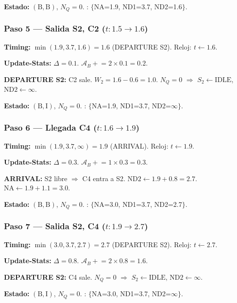 \documentclass[11pt, letterpaper]{article}
\begin{document}
\textbf{Estado:} $(\text{B}, \text{B})$, $N_Q = 0$. \quad \FEL: $\{$NA=1.9, ND1=3.7, ND2=1.6$\}$.

\subsubsection*{Paso 5 --- Salida S2, C2 ($t: 1.5 \to 1.6$)}

\textbf{Timing:} $\min(1.9, 3.7, 1.6) = 1.6$ (DEPARTURE S2). Reloj: $t \leftarrow 1.6$.

\textbf{Update-Stats:} $\Delta = 0.1$. $\mathcal{A}_B \mathrel{+}= 2 \times 0.1 = 0.2$.

\textbf{DEPARTURE S2:} C2 sale. $W_2 = 1.6 - 0.6 = 1.0$. $N_Q = 0$ $\Rightarrow$ $S_2 \leftarrow \text{IDLE}$, $\text{ND2} \leftarrow \infty$.

\textbf{Estado:} $(\text{B}, \text{I})$, $N_Q = 0$. \quad \FEL: $\{$NA=1.9, ND1=3.7, ND2=$\infty\}$.

\subsubsection*{Paso 6 --- Llegada C4 ($t: 1.6 \to 1.9$)}

\textbf{Timing:} $\min(1.9, 3.7, \infty) = 1.9$ (ARRIVAL). Reloj: $t \leftarrow 1.9$.

\textbf{Update-Stats:} $\Delta = 0.3$. $\mathcal{A}_B \mathrel{+}= 1 \times 0.3 = 0.3$.

\textbf{ARRIVAL:} S2 libre $\Rightarrow$ C4 entra a S2. $\text{ND2} \leftarrow 1.9 + 0.8 = 2.7$. $\text{NA} \leftarrow 1.9 + 1.1 = 3.0$.

\textbf{Estado:} $(\text{B}, \text{B})$, $N_Q = 0$. \quad \FEL: $\{$NA=3.0, ND1=3.7, ND2=2.7$\}$.

\subsubsection*{Paso 7 --- Salida S2, C4 ($t: 1.9 \to 2.7$)}

\textbf{Timing:} $\min(3.0, 3.7, 2.7) = 2.7$ (DEPARTURE S2). Reloj: $t \leftarrow 2.7$.

\textbf{Update-Stats:} $\Delta = 0.8$. $\mathcal{A}_B \mathrel{+}= 2 \times 0.8 = 1.6$.

\textbf{DEPARTURE S2:} C4 sale. $N_Q = 0$ $\Rightarrow$ $S_2 \leftarrow \text{IDLE}$, $\text{ND2} \leftarrow \infty$.

\textbf{Estado:} $(\text{B}, \text{I})$, $N_Q = 0$. \quad \FEL: $\{$NA=3.0, ND1=3.7, ND2=$\infty\}$.
\end{document}

